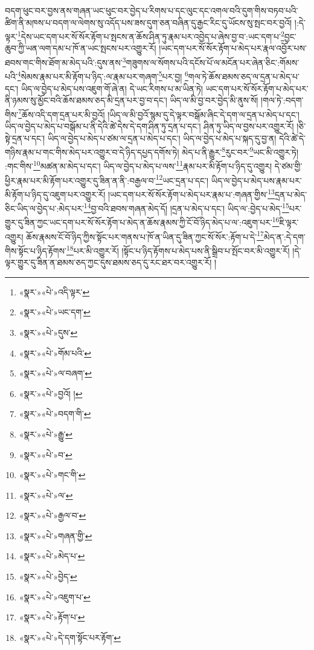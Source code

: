 བདག་ཕུང་བར་བྱས་ནས་གཞན་ཡང་ཕུང་བར་བྱེད་པ་རིགས་པ་དང་ལུང་དང་འགལ་བའི་དུག་གིས་བཏབ་པའི་ཚིག་ནི་མཁས་པ་བདག་ལ་ལེགས་སུ་འདོད་པས་ཟས་དུག་ཅན་བཞིན་དུ་རྒྱང་རིང་དུ་ཡོངས་སུ་སྤང་བར་བྱའོ། །:དེ་ལྟར་\footnote{«སྣར་»«པེ་»འདི་ལྟར་}དེས་ཡང་དག་པར་སོ་སོར་རྟོག་པ་སྤངས་ན་ཆོས་ཤིན་ཏུ་རྣམ་པར་འབྱེད་པ་ཞེས་བྱ་བ་:ཡང་དག་པ་\footnote{«སྣར་»«པེ་»ཡང་དག་}བྱང་ཆུབ་ཀྱི་ཡན་ལག་དམ་པ་ཁོ་ན་ཡང་སྤངས་པར་འགྱུར་རོ། །ཡང་དག་པར་སོ་སོར་རྟོག་པ་མེད་པར་རྣལ་འབྱོར་པས་ཐབས་གང་གིས་ཐོག་མ་མེད་པའི་:དུས་ནས་\footnote{«སྣར་»«པེ་»དུས་}གཟུགས་ལ་སོགས་པའི་དངོས་པོ་ལ་མངོན་པར་ཞེན་ཅིང་:གོམས་པའི་\footnote{«སྣར་»«པེ་»གོམ་པའི་}སེམས་རྣམ་པར་མི་རྟོག་པ་ཉིད་:ལ་རྣམ་པར་གཞག་\footnote{«སྣར་»«པེ་»ལ་བཞག་}པར་བྱ། \footnote{«སྣར་»«པེ་»བྱའོ། ། }གལ་ཏེ་ཆོས་ཐམས་ཅད་ལ་དྲན་པ་མེད་པ་དང་། ཡིད་ལ་བྱེད་པ་མེད་པས་འཇུག་གོ་ཞེ་ན། དེ་ཡང་རིགས་པ་མ་ཡིན་ཏེ། ཡང་དག་པར་སོ་སོར་རྟོག་པ་མེད་པར་ནི་ཉམས་སུ་མྱོང་བའི་ཆོས་ཐམས་ཅད་མི་དྲན་པར་བྱ་བ་དང་། ཡིད་ལ་མི་བྱ་བར་བྱེད་མི་ནུས་སོ། །གལ་ཏེ་:བདག་གིས་\footnote{«སྣར་»«པེ་»བདག་གི་}ཆོས་འདི་དག་དྲན་པར་མི་བྱའོ། །ཡིད་ལ་མི་བྱའོ་སྙམ་དུ་དེ་ལྟར་བསྒོམ་ཞིང་དེ་དག་ལ་དྲན་པ་མེད་པ་དང་། ཡིད་ལ་བྱེད་པ་མེད་པ་བསྒོམ་པ་ནི་དེའི་ཚེ་དེས་དེ་དག་ཤིན་ཏུ་དྲན་པ་དང་། ཤིན་ཏུ་ཡིད་ལ་བྱས་པར་འགྱུར་རོ། །ཅི་སྟེ་དྲན་པ་དང་། ཡིད་ལ་བྱེད་པ་མེད་པ་ཙམ་ལ་དྲན་པ་མེད་པ་དང་། ཡིད་ལ་བྱེད་པ་མེད་པ་སྐད་དུ་བྱ་ན། དེའི་ཚེ་དེ་གཉིས་རྣམ་པ་གང་གིས་མེད་པར་འགྱུར་བ་དེ་ཉིད་དཔྱད་དགོས་ཏེ། མེད་པ་ནི་རྒྱུར་\footnote{«སྣར་»«པེ་»རྒྱུ་}རུང་བར་\footnote{«སྣར་»«པེ་»བ་}ཡང་མི་འགྱུར་ཏེ། :གང་གིས་\footnote{«སྣར་»«པེ་»གང་གི་}མཚན་མ་མེད་པ་དང་། ཡིད་ལ་བྱེད་པ་མེད་པ་ལས་\footnote{«སྣར་»«པེ་»ལ་}རྣམ་པར་མི་རྟོག་པ་ཉིད་དུ་འགྱུར། དེ་ཙམ་གྱི་ཕྱིར་རྣམ་པར་མི་རྟོག་པར་འགྱུར་དུ་ཟིན་ན་ནི་:བརྒྱལ་བ་\footnote{«སྣར་»«པེ་»རྒྱལ་བ་}ཡང་དྲན་པ་དང་། ཡིད་ལ་བྱེད་པ་མེད་པས་རྣམ་པར་མི་རྟོག་པ་ཉིད་དུ་འཇུག་པར་འགྱུར་རོ། །ཡང་དག་པར་སོ་སོར་རྟོག་པ་མེད་པར་རྣམ་པ་:གཞན་གྱིས་\footnote{«སྣར་»«པེ་»གཞན་གྱི་}དྲན་པ་མེད་ཅིང་ཡིད་ལ་བྱེད་པ་:མེད་པར་\footnote{«སྣར་»«པེ་»མེད་པ་}བྱ་བའི་ཐབས་གཞན་མེད་དོ། །དྲན་པ་མེད་པ་དང་། ཡིད་ལ་:བྱེད་པ་མེད་\footnote{«སྣར་»«པེ་»བྱེད་}པར་གྱུར་དུ་ཟིན་ཀྱང་ཡང་དག་པར་སོ་སོར་རྟོག་པ་མེད་ན་ཆོས་རྣམས་ཀྱི་ངོ་བོ་ཉིད་མེད་པ་ལ་:འཇུག་པར་\footnote{«སྣར་»«པེ་»འཇུག་པ་}ཇི་ལྟར་འགྱུར། ཆོས་རྣམས་ངོ་བོ་ཉིད་ཀྱིས་སྟོང་པར་གནས་པ་ཁོ་ན་ཡིན་དུ་ཟིན་ཀྱང་སོ་སོར་:རྟོག་པ་དེ་\footnote{«སྣར་»«པེ་»རྟོག་པ་}མེད་ན་:དེ་དག་གིས་སྟོང་པ་ཉིད་རྟོགས་\footnote{«སྣར་»«པེ་»དེ་དག་སྟོང་པར་རྟོག་}པར་མི་འགྱུར་རོ། །སྟོང་པ་ཉིད་རྟོགས་པ་མེད་པས་ནི་སྒྲིབ་པ་སྤོང་བར་མི་འགྱུར་རོ། །དེ་ལྟར་གྱུར་དུ་ཟིན་ན་ཐམས་ཅད་ཀྱང་དུས་ཐམས་ཅད་དུ་རང་ཐར་བར་འགྱུར་རོ། །
